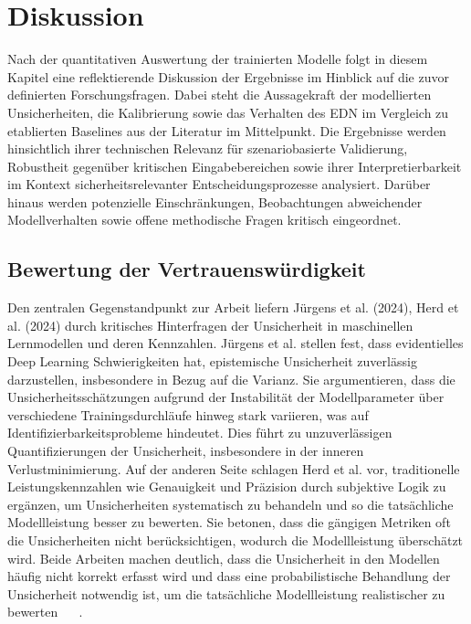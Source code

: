 
\chapter{Diskussion}\label{chapter:diskussion}

Nach der quantitativen Auswertung der trainierten Modelle folgt in diesem Kapitel eine reflektierende Diskussion der Ergebnisse im Hinblick auf die zuvor definierten Forschungsfragen. Dabei steht die Aussagekraft der modellierten Unsicherheiten, die Kalibrierung sowie das Verhalten des EDN im Vergleich zu etablierten Baselines aus der Literatur im Mittelpunkt. Die Ergebnisse werden hinsichtlich ihrer technischen Relevanz für szenariobasierte Validierung, Robustheit gegenüber kritischen Eingabebereichen sowie ihrer Interpretierbarkeit im Kontext sicherheitsrelevanter Entscheidungsprozesse analysiert. Darüber hinaus werden potenzielle Einschränkungen, Beobachtungen abweichender Modellverhalten sowie offene methodische Fragen kritisch eingeordnet.

\section{Bewertung der Vertrauenswürdigkeit}


Den zentralen Gegenstandpunkt zur Arbeit liefern Jürgens et al. (2024), Herd et al. (2024) durch kritisches Hinterfragen der Unsicherheit in maschinellen Lernmodellen und deren Kennzahlen. Jürgens et al. stellen fest, dass evidentielles Deep Learning Schwierigkeiten hat, epistemische Unsicherheit zuverlässig darzustellen, insbesondere in Bezug auf die Varianz. Sie argumentieren, dass die Unsicherheitsschätzungen aufgrund der Instabilität der Modellparameter über verschiedene Trainingsdurchläufe hinweg stark variieren, was auf Identifizierbarkeitsprobleme hindeutet. Dies führt zu unzuverlässigen Quantifizierungen der Unsicherheit, insbesondere in der inneren Verlustminimierung. Auf der anderen Seite schlagen Herd et al. vor, traditionelle Leistungskennzahlen wie Genauigkeit und Präzision durch subjektive Logik zu ergänzen, um Unsicherheiten systematisch zu behandeln und so die tatsächliche Modellleistung besser zu bewerten. Sie betonen, dass die gängigen Metriken oft die Unsicherheiten nicht berücksichtigen, wodurch die Modellleistung überschätzt wird. Beide Arbeiten machen deutlich, dass die Unsicherheit in den Modellen häufig nicht korrekt erfasst wird und dass eine probabilistische Behandlung der Unsicherheit notwendig ist, um die tatsächliche Modellleistung realistischer zu bewerten ~\parencite{Jurgens.} ~\parencite{Herd04082024}.

